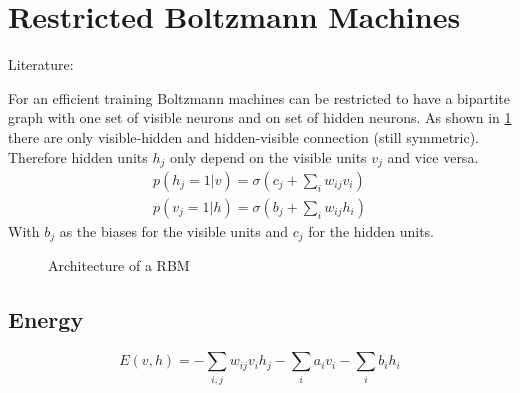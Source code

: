 \section{Restricted Boltzmann Machines}\label{sec:rbm}%
Literature: \cite{Bengio2009}

For an efficient training Boltzmann machines can be restricted to have a
bipartite graph with one set of visible neurons and on set of hidden neurons.
As shown in \cref{fig:rbm} there are only visible-hidden and
hidden-visible connection (still symmetric). Therefore hidden units $h_j$ only
depend on the visible units $v_j$ and vice versa.
\begin{align}
p(h_j=1|v) = \sigma(c_j + \sum_i w_{ij} v_i)\\
p(v_j=1|h) = \sigma(b_j + \sum_i w_{ij} h_i)
\end{align}
With $b_j$ as the biases for the visible units and $c_j$ for the hidden units.

\begin{figure}
\centering
{}
\caption{Architecture of a \gls{RBM}}
\label{fig:rbm}
\end{figure}

\subsection{Energy}
\begin{equation}\label{eq:rbm-energy}
E(v,h) = - \sum_{i,j} w_{ij} v_i h_j - \sum_i a_i v_i - \sum_i b_i h_i
\end{equation}

